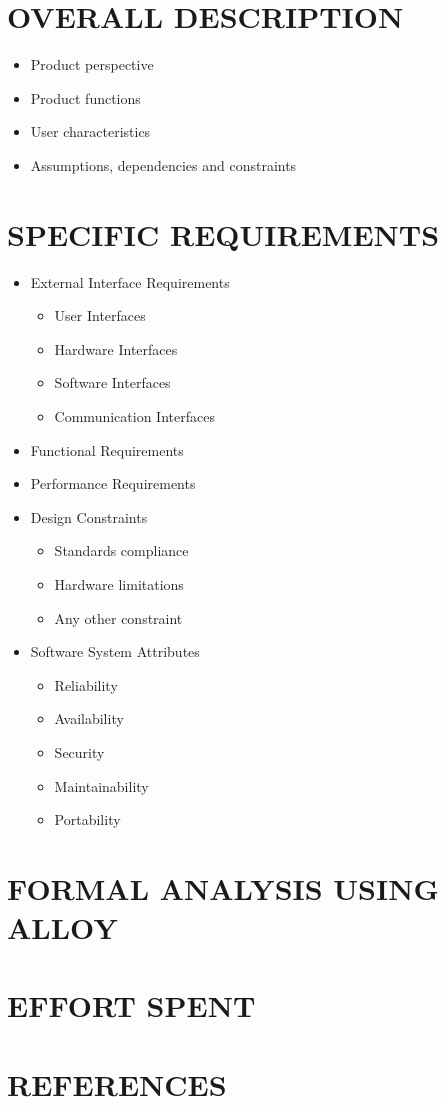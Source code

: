 \documentclass{article}
\begin{document}
\section{OVERALL DESCRIPTION}
\begin{itemize}
\item Product perspective
\item Product functions
\item User characteristics
\item Assumptions, dependencies and constraints
\end{itemize}

\section{SPECIFIC REQUIREMENTS}
\begin{itemize}
	\item External Interface Requirements
		\begin{itemize}
			\item User Interfaces
			\item Hardware Interfaces
			\item Software Interfaces
			\item Communication Interfaces
		\end{itemize}
	\item Functional Requirements
	\item Performance Requirements
	\item Design Constraints
		\begin{itemize}
			\item Standards compliance
			\item Hardware limitations
			\item Any other constraint
		\end{itemize}
	\item Software System Attributes
		\begin{itemize}
			\item Reliability
			\item Availability
			\item Security
			\item Maintainability
			\item Portability
		\end{itemize}
\end{itemize}


\section{FORMAL ANALYSIS USING ALLOY}

\section{EFFORT SPENT}

\section{REFERENCES}
\end{document}
